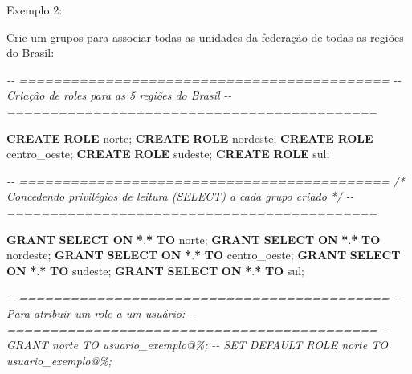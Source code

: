 \documentclass[
]{book}
\newenvironment{Shaded}{\begin{snugshade}}{\end{snugshade}}
\newcommand{\CommentTok}[1]{\textcolor[rgb]{0.56,0.35,0.01}{\textit{#1}}}
\newcommand{\KeywordTok}[1]{\textcolor[rgb]{0.13,0.29,0.53}{\textbf{#1}}}
\newcommand{\NormalTok}[1]{#1}
\newcommand{\OperatorTok}[1]{\textcolor[rgb]{0.81,0.36,0.00}{\textbf{#1}}}
\newcommand{\StringTok}[1]{\textcolor[rgb]{0.31,0.60,0.02}{#1}}
\begin{document}
Exemplo 2:

Crie um grupos para associar todas as unidades da federação de todas as regiões do Brasil:

\begin{Shaded}
\begin{Highlighting}[]
\CommentTok{{-}{-} ===========================================}
\CommentTok{{-}{-} Criação de roles para as 5 regiões do Brasil}
\CommentTok{{-}{-} ===========================================}

\KeywordTok{CREATE} \KeywordTok{ROLE} \StringTok{\textquotesingle{}norte\textquotesingle{}}\NormalTok{;}
\KeywordTok{CREATE} \KeywordTok{ROLE} \StringTok{\textquotesingle{}nordeste\textquotesingle{}}\NormalTok{;}
\KeywordTok{CREATE} \KeywordTok{ROLE} \StringTok{\textquotesingle{}centro\_oeste\textquotesingle{}}\NormalTok{;}
\KeywordTok{CREATE} \KeywordTok{ROLE} \StringTok{\textquotesingle{}sudeste\textquotesingle{}}\NormalTok{;}
\KeywordTok{CREATE} \KeywordTok{ROLE} \StringTok{\textquotesingle{}sul\textquotesingle{}}\NormalTok{;}

\CommentTok{{-}{-} ===========================================}
\CommentTok{/*}
\CommentTok{Concedendo privilégios de leitura (SELECT) a cada grupo criado}
\CommentTok{*/}
\CommentTok{{-}{-} ===========================================}

\KeywordTok{GRANT} \KeywordTok{SELECT} \KeywordTok{ON} \OperatorTok{*}\NormalTok{.}\OperatorTok{*} \KeywordTok{TO} \StringTok{\textquotesingle{}norte\textquotesingle{}}\NormalTok{;}
\KeywordTok{GRANT} \KeywordTok{SELECT} \KeywordTok{ON} \OperatorTok{*}\NormalTok{.}\OperatorTok{*} \KeywordTok{TO} \StringTok{\textquotesingle{}nordeste\textquotesingle{}}\NormalTok{;}
\KeywordTok{GRANT} \KeywordTok{SELECT} \KeywordTok{ON} \OperatorTok{*}\NormalTok{.}\OperatorTok{*} \KeywordTok{TO} \StringTok{\textquotesingle{}centro\_oeste\textquotesingle{}}\NormalTok{;}
\KeywordTok{GRANT} \KeywordTok{SELECT} \KeywordTok{ON} \OperatorTok{*}\NormalTok{.}\OperatorTok{*} \KeywordTok{TO} \StringTok{\textquotesingle{}sudeste\textquotesingle{}}\NormalTok{;}
\KeywordTok{GRANT} \KeywordTok{SELECT} \KeywordTok{ON} \OperatorTok{*}\NormalTok{.}\OperatorTok{*} \KeywordTok{TO} \StringTok{\textquotesingle{}sul\textquotesingle{}}\NormalTok{;}

\CommentTok{{-}{-} ===========================================}
\CommentTok{{-}{-} Para atribuir um role a um usuário:}
\CommentTok{{-}{-} ===========================================}
\CommentTok{{-}{-} GRANT \textquotesingle{}norte\textquotesingle{} TO \textquotesingle{}usuario\_exemplo\textquotesingle{}@\textquotesingle{}\%\textquotesingle{};}
\CommentTok{{-}{-} SET DEFAULT ROLE \textquotesingle{}norte\textquotesingle{} TO \textquotesingle{}usuario\_exemplo\textquotesingle{}@\textquotesingle{}\%\textquotesingle{};}
\end{Highlighting}
\end{Shaded}
\end{document}
